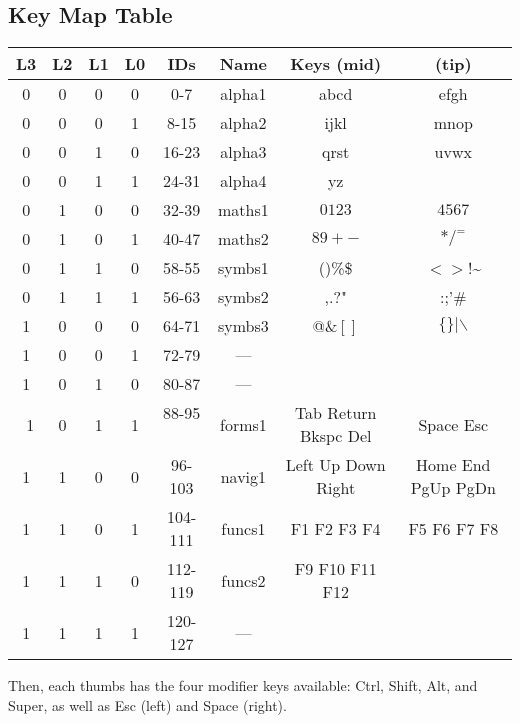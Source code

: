 \documentclass{article}
\begin{document}
\subsection{Key Map Table}
\begin{center}
\begin{tabular}{|c c c c|c|c|cc|}
  \hline
  L3 & L2 & L1 & L0 & IDs     & Name   & Keys (mid) & (tip) \\ \hline
  0  & 0  & 0  & 0  & 0-7     & alpha1 & abcd       & efgh \\ \hline
  0  & 0  & 0  & 1  & 8-15    & alpha2 & ijkl       & mnop \\ \hline
  0  & 0  & 1  & 0  & 16-23   & alpha3 & qrst       & uvwx \\ \hline
  0  & 0  & 1  & 1  & 24-31   & alpha4 & yz         &      \\ \hline
  0  & 1  & 0  & 0  & 32-39   & maths1 & $0123$     & $4567$ \\ \hline
  0  & 1  & 0  & 1  & 40-47   & maths2 & $89+-$     & $*/^=$ \\ \hline
  0  & 1  & 1  & 0  & 58-55   & symbs1 &()\%\$      & $<>$!\textasciitilde \\ \hline
  0  & 1  & 1  & 1  & 56-63   & symbs2 & ,.?"       & :;'\#\\ \hline
  1  & 0  & 0  & 0  & 64-71   & symbs3 & @\&$[]$    & $\{\}|\backslash$ \\ \hline
  1  & 0  & 0  & 1  & 72-79   &  ---   && \\ \hline
  1  & 0  & 1  & 0  & 80-87   &  ---   && \\ \hline
  1  & 0  & 1  & 1  & 88-95   & forms1 & Tab Return Bkspc Del & Space Esc \\ \hline
  1  & 1  & 0  & 0  & 96-103  & navig1 & Left Up Down Right & Home End PgUp PgDn \\ \hline
  1  & 1  & 0  & 1  & 104-111 & funcs1 & F1 F2 F3 F4 & F5 F6 F7 F8 \\ \hline
  1  & 1  & 1  & 0  & 112-119 & funcs2 & F9 F10 F11 F12 & \\ \hline
  1  & 1  & 1  & 1  & 120-127 &  ---   && \\ \hline
\end{tabular}
\end{center}

Then, each thumbs has the four modifier keys available: Ctrl, Shift, Alt, and Super, as well as Esc (left) and Space (right).
\end{document}
